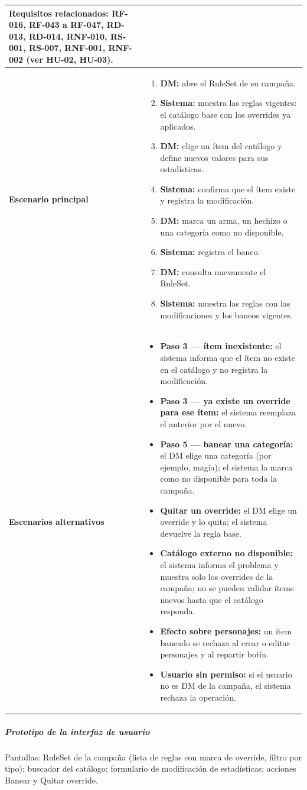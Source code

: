 {\begin{longtable}{|>{\raggedright\arraybackslash\bfseries}p{3.2cm}|>{\raggedright\arraybackslash}p{11.9cm}|}
Requisitos relacionados: RF-016, RF-043 a RF-047, RD-013, RD-014, RNF-010, RS-001, RS-007, RNF-001, RNF-002 (ver HU-02, HU-03). \\ \hline
Escenario principal & \begin{enumerate}[itemsep=2pt,topsep=2pt]
\item \textbf{DM:} abre el RuleSet de su campaña.
\item \textbf{Sistema:} muestra las reglas vigentes: el catálogo base con los overrides ya aplicados.
\item \textbf{DM:} elige un ítem del catálogo y define nuevos valores para sus estadísticas.
\item \textbf{Sistema:} confirma que el ítem existe y registra la modificación.
\item \textbf{DM:} marca un arma, un hechizo o una categoría como no disponible.
\item \textbf{Sistema:} registra el baneo.
\item \textbf{DM:} consulta nuevamente el RuleSet.
\item \textbf{Sistema:} muestra las reglas con las modificaciones y los baneos vigentes.
\end{enumerate} \\ \hline
Escenarios alternativos & \begin{itemize}[itemsep=2pt,topsep=2pt]
\item \textbf{Paso 3 — ítem inexistente:} el sistema informa que el ítem no existe en el catálogo y no registra la modificación.
\item \textbf{Paso 3 — ya existe un override para ese ítem:} el sistema reemplaza el anterior por el nuevo.
\item \textbf{Paso 5 — banear una categoría:} el DM elige una categoría (por ejemplo, magia); el sistema la marca como no disponible para toda la campaña.
\item \textbf{Quitar un override:} el DM elige un override y lo quita; el sistema devuelve la regla base.
\item \textbf{Catálogo externo no disponible:} el sistema informa el problema y muestra solo los overrides de la campaña; no se pueden validar ítems nuevos hasta que el catálogo responda.
\item \textbf{Efecto sobre personajes:} un ítem baneado se rechaza al crear o editar personajes y al repartir botín.
\item \textbf{Usuario sin permiso:} si el usuario no es DM de la campaña, el sistema rechaza la operación.
\end{itemize} \\ \hline
\end{longtable}}
\subparagraph{Prototipo de la interfaz de usuario}
Pantallas: RuleSet de la campaña (lista de reglas con marca de override, filtro por tipo); buscador del catálogo; formulario de modificación de estadísticas; acciones Banear y Quitar override.

